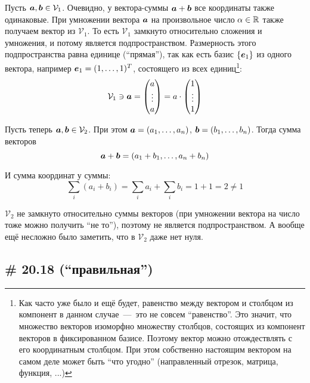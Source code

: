 \documentclass[a4paper,12pt]{article}
\begin{document}
  \begin{solution}
    Пусть $\boldsymbol a, \boldsymbol b \in \mathcal V_1$.
    Очевидно, у вектора-суммы $\bds a \hm+ \bds b$ все координаты также одинаковые.
    При умножении вектора $\boldsymbol a$ на произвольное число $\alpha \hm\in \RR$ также получаем вектор из $\mathcal V_1$.
    То есть $\mathcal V_1$ замкнуто относительно сложения и умножения, и потому является подпространством.
    Размерность этого подпространства равна единице (``прямая''), так как есть базис $\{\boldsymbol e_1\}$ из одного вектора, например $\bds e_1 \hm= (1, \ldots, 1)^T$, состоящего из всех единиц\footnote{Как часто уже было и ещё будет, равенство между вектором и столбцом из компонент в данном случае~---~это не совсем ``равенство''. Это значит, что множество векторов изоморфно множеству столбцов, состоящих из компонент векторов в фиксированном базисе. Поэтому вектор можно отождествлять с его координатным столбцом. При этом собственно настоящим вектором на самом деле может быть ``что угодно'' (направленный отрезок, матрица, функция, ...)}:
    \[
      \mathcal V_1 \ni \boldsymbol a = \begin{pmatrix}
        a \\ \vdots \\ a
      \end{pmatrix} = a \cdot \begin{pmatrix}
        1 \\ \vdots \\ 1
      \end{pmatrix}
    \]
    
    \medskip
    
    Пусть теперь $\boldsymbol a, \boldsymbol b \in \mathcal V_2$.
    При этом $\bds a \hm= (a_1, \ldots, a_n)$, $\bds b \hm= (b_1, \ldots, b_n)$.
    Тогда сумма векторов
    \[
      \boldsymbol a + \boldsymbol b = (a_1 + b_1, \ldots, a_n + b_n)
    \]
    
    И сумма координат у суммы:
    \[
      \sum_i (a_i + b_i) = \sum_i a_i + \sum_i b_i = 1 + 1 = 2 \not= 1
    \]
    
    $\mathcal V_2$ не замкнуто относительно суммы векторов (при умножении вектора на число тоже можно получить ``не то''), поэтому не является подпространством.
    А вообще ещё несложно было заметить, что в $\mathcal V_2$ даже нет нуля.
  \end{solution}
  
  
  \subsection{\# 20.18 (``правильная'')}
  
\end{document}
